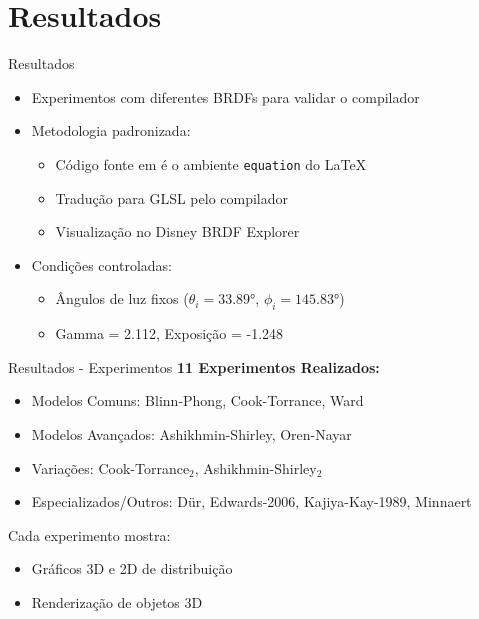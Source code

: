 \section{Resultados}

\begin{frame}{Resultados}
   \begin{itemize}
       \item Experimentos com diferentes BRDFs para validar o compilador
       \item Metodologia padronizada:
             \begin{itemize}
                 \item Código fonte em é o  ambiente \texttt{equation} do \LaTeX{}
                 \item Tradução para GLSL pelo compilador
                 \item Visualização no Disney BRDF Explorer
             \end{itemize}
       \item Condições controladas:
             \begin{itemize}
                 \item Ângulos de luz fixos ($\theta_i = 33.89°$, $\phi_i = 145.83°$)
                 \item Gamma = 2.112, Exposição = -1.248
             \end{itemize}
   \end{itemize}
\end{frame}

\begin{frame}{Resultados - Experimentos}
\textbf{11 Experimentos Realizados:}
         \begin{itemize}
             \item Modelos Comuns: Blinn-Phong, Cook-Torrance, Ward
             \item Modelos Avançados: Ashikhmin-Shirley, Oren-Nayar
             \item Variações: Cook-Torrance$_2$, Ashikhmin-Shirley$_2$
             \item Especializados/Outros: Dür, Edwards-2006, Kajiya-Kay-1989, Minnaert
         \end{itemize}

   Cada experimento mostra:
         \begin{itemize}
             \item Gráficos 3D e 2D de distribuição
             \item Renderização de objetos 3D
         \end{itemize}
\end{frame}

